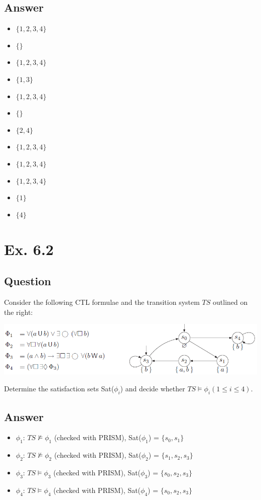 \documentclass[12pt]{article}
\begin{document}
\subsection*{Answer}
\begin{itemize}
	\item $\{1,2,3,4\}$
	\item $\{\}$
	\item $\{1,2,3,4\}$
	\item $\{1,3\}$
	\item $\{1,2,3,4\}$
	\item $\{\}$
	\item $\{2,4\}$
	\item $\{1,2,3,4\}$
	\item $\{1,2,3,4\}$
	\item $\{1,2,3,4\}$
	\item $\{1\}$
	\item $\{4\}$
\end{itemize}


\newpage
\section*{Ex. 6.2}
\subsection*{Question}
Consider the following CTL formulae and the transition system $TS$ outlined on
the right:
\begin{center}
	\includegraphics*[scale=0.6]{ex62.png}
\end{center}
Determine the satisfaction sets Sat($\phi_i$) and decide whether $TS \models\phi_i (1\leq i\leq 4)$.

\subsection*{Answer}
\begin{itemize}
	\item $\phi_1$: $TS \not\models \phi_1$ (checked with PRISM), Sat($\phi_1$) = $\{s_0, s_1\}$
	\item $\phi_2$: $TS \not\models \phi_2$ (checked with PRISM), Sat($\phi_2$) = $\{s_1, s_2, s_3\}$
	\item $\phi_3$: $TS \models \phi_3$ (checked with PRISM), Sat($\phi_3$) = $\{s_0, s_2, s_3\}$
	\item $\phi_4$: $TS \models \phi_4$ (checked with PRISM), Sat($\phi_4$) = $\{s_0, s_2, s_3\}$
\end{itemize}
\end{document}
